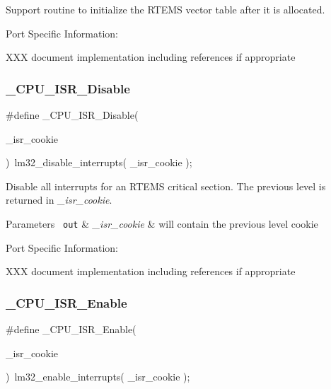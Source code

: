 Support routine to initialize the R\+T\+E\+MS vector table after it is allocated.

Port Specific Information\+:

X\+XX document implementation including references if appropriate \mbox{\label{group__RTEMSScoreCPUlm32Interrupt_gaca3fde6f372ee51fdd893c260e7d7146}} 
\subsubsection{\texorpdfstring{\_CPU\_ISR\_Disable}{\_CPU\_ISR\_Disable}}
{\footnotesize\ttfamily \#define \+\_\+\+C\+P\+U\+\_\+\+I\+S\+R\+\_\+\+Disable(\begin{DoxyParamCaption}\item[{}]{\+\_\+isr\+\_\+cookie }\end{DoxyParamCaption})~lm32\+\_\+disable\+\_\+interrupts( \+\_\+isr\+\_\+cookie );}

Disable all interrupts for an R\+T\+E\+MS critical section. The previous level is returned in {\itshape \+\_\+isr\+\_\+cookie}.


\begin{DoxyParams}[1]{Parameters}
\mbox{\texttt{ out}}  & {\em \+\_\+isr\+\_\+cookie} & will contain the previous level cookie\\
\hline
\end{DoxyParams}
Port Specific Information\+:

X\+XX document implementation including references if appropriate \mbox{\label{group__RTEMSScoreCPUlm32Interrupt_gae3b1e2cd1ea4020d229e759569459664}} 
\subsubsection{\texorpdfstring{\_CPU\_ISR\_Enable}{\_CPU\_ISR\_Enable}}
{\footnotesize\ttfamily \#define \+\_\+\+C\+P\+U\+\_\+\+I\+S\+R\+\_\+\+Enable(\begin{DoxyParamCaption}\item[{}]{\+\_\+isr\+\_\+cookie }\end{DoxyParamCaption})~lm32\+\_\+enable\+\_\+interrupts( \+\_\+isr\+\_\+cookie );}

